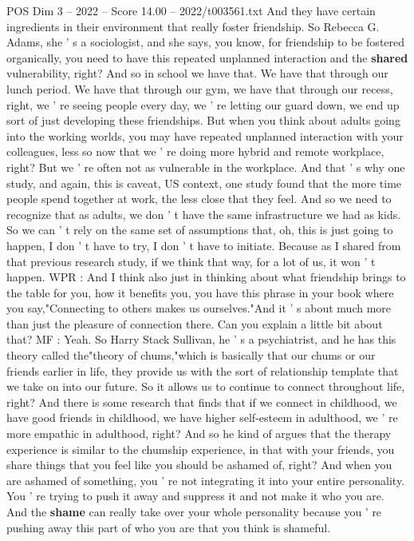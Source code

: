 \begin{textsample}{POS Dim 3 – 2022 – Score 14.00 – 2022/t003561.txt}
And they have certain ingredients in their environment that really foster friendship.
So Rebecca G.
Adams, she ' s a sociologist, and she says, you know, for friendship to be fostered organically, you need to have this repeated unplanned interaction and the \textbf{shared} vulnerability, right?
And so in school we have that.
We have that through our lunch period.
We have that through our gym, we have that through our recess, right, we ' re seeing people every day, we ' re letting our guard down, we end up sort of just developing these friendships.
But when you think about adults going into the working worlds, you may have repeated unplanned interaction with your colleagues, less so now that we ' re doing more hybrid and remote workplace, right?
But we ' re often not as vulnerable in the workplace.
And that ' s why one study, and again, this is caveat, US context, one study found that the more time people spend together at work, the less close that they feel.
And so we need to recognize that as adults, we don ' t have the same infrastructure we had as kids.
So we can ' t rely on the same set of assumptions that, oh, this is just going to happen, I don ' t have to try, I don ' t have to initiate.
Because as I shared from that previous research study, if we think that way, for a lot of us, it won ' t happen.
WPR : And I think also just in thinking about what friendship brings to the table for you, how it benefits you, you have this phrase in your book where you say,"Connecting to others makes us ourselves."And it ' s about much more than just the pleasure of connection there.
Can you explain a little bit about that?
MF : Yeah.
So Harry Stack Sullivan, he ' s a psychiatrist, and he has this theory called the"theory of chums,"which is basically that our chums or our friends earlier in life, they provide us with the sort of relationship template that we take on into our future.
So it allows us to continue to connect throughout life, right?
And there is some research that finds that if we connect in childhood, we have good friends in childhood, we have higher self-esteem in adulthood, we ' re more empathic in adulthood, right?
And so he kind of argues that the therapy experience is similar to the chumship experience, in that with your friends, you share things that you feel like you should be ashamed of, right?
And when you are ashamed of something, you ' re not integrating it into your entire personality.
You ' re trying to push it away and suppress it and not make it who you are.
And the \textbf{shame} can really take over your whole personality because you ' re pushing away this part of who you are that you think is shameful.

\end{textsample}
